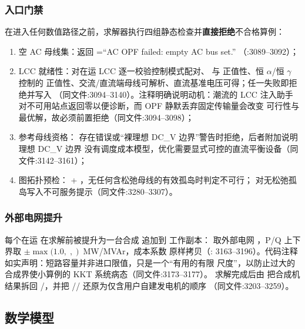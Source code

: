 \subsubsection*{入口门禁}
在进入任何数值路径之前，求解器执行四组静态检查并\textbf{直接拒绝}不合格算例：
\begin{enumerate}
  \item 空 AC 母线集：返回 =``AC OPF failed: empty AC bus set.''
        （:3089--3092）；
  \item LCC 就绪性：对在运 LCC 逐一校验控制模式配对、 与
         正值性、恒 $\alpha$/恒 $\gamma$ 控制的 
        正值性、交流/直流端母线可解析、直流基准电压可得；任一失败即拒绝并写入
        （同文件:3094--3140）。注释明确说明动机：潮流的
        LCC 注入助手对不可用站点返回零以便诊断，而 OPF 静默丢弃固定传输量会改变
        可行性与最优解，故必须前置拒绝（同文件:3094--3098）；
  \item 参考母线资格：
        存在错误或``裸理想 DC\_V 边界''警告时拒绝，后者附加说明理想 DC\_V 边界
        没有调度成本模型，优化需要显式可控的直流平衡设备（同文件:3142--3161）；
  \item 图拓扑预检： +
        ，无任何含松弛母线的有效孤岛时判定不可行；
        对无松弛孤岛写入不可服务提示（同文件:3280--3307）。
\end{enumerate}

\subsubsection*{外部电网提升}
每个在运  在求解前被提升为一台合成  追加到
工作副本： 取外部电网 ，P/Q 上下界取
$\pm\max(1.0,\;$$,\;$$)$~MW/MVAr，成本系数
 原样拷贝（:
3163--3196）。代码注释如实声明：短路容量并非进口限值，只是一个``有用的有限
尺度''，以防止过大的合成界使小算例的 KKT 系统病态（同文件:3173--3177）。
求解完成后由  把合成机结果拆回
/，并把
// 还原为仅含用户自建发电机的顺序
（同文件:3203--3259）。

\subsection{数学模型}\label{subsec:acopfnative:model}

